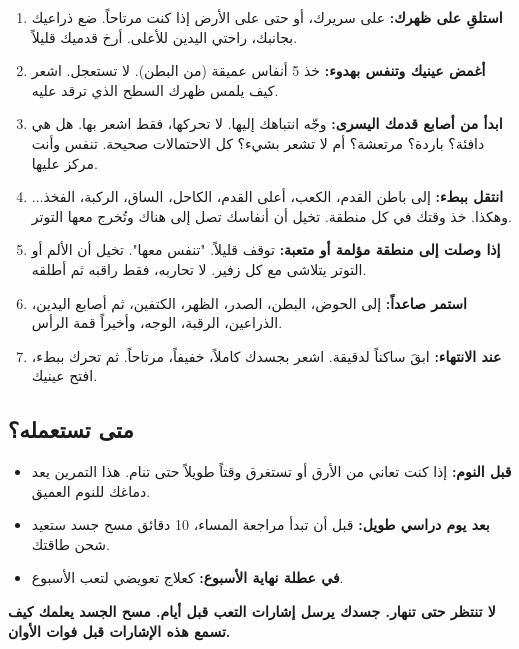 \documentclass[12pt,a4paper]{book}
\newcommand{\importantAr}[1]{%
	\begin{important}
		\bfseries #1
	\end{important}
}
\begin{document}
	\begin{enumerate}
		\item \textbf{استلقِ على ظهرك:} على سريرك، أو حتى على الأرض إذا كنت مرتاحاً. ضع ذراعيك بجانبك، راحتي اليدين للأعلى. أرخ قدميك قليلاً.
		
		\item \textbf{أغمض عينيك وتنفس بهدوء:} خذ 5 أنفاس عميقة (من البطن). لا تستعجل. اشعر كيف يلمس ظهرك السطح الذي ترقد عليه.
		
		\item \textbf{ابدأ من أصابع قدمك اليسرى:} وجّه انتباهك إليها. لا تحركها، فقط اشعر بها. هل هي دافئة؟ باردة؟ مرتعشة؟ أم لا تشعر بشيء؟ كل الاحتمالات صحيحة. تنفس وأنت مركز عليها.
		
		\item \textbf{انتقل ببطء:} إلى باطن القدم، الكعب، أعلى القدم، الكاحل، الساق، الركبة، الفخذ... وهكذا. خذ وقتك في كل منطقة. تخيل أن أنفاسك تصل إلى هناك وتُخرج معها التوتر.
		
		\item \textbf{إذا وصلت إلى منطقة مؤلمة أو متعبة:} توقف قليلاً. "تنفس معها". تخيل أن الألم أو التوتر يتلاشى مع كل زفير. لا تحاربه، فقط راقبه ثم أطلقه.
		
		\item \textbf{استمر صاعداً:} إلى الحوض، البطن، الصدر، الظهر، الكتفين، ثم أصابع اليدين، الذراعين، الرقبة، الوجه، وأخيراً قمة الرأس.
		
		\item \textbf{عند الانتهاء:} ابقَ ساكناً لدقيقة. اشعر بجسدك كاملاً، خفيفاً، مرتاحاً. ثم تحرك ببطء، افتح عينيك.
	\end{enumerate}
	
	\subsection{متى تستعمله؟}
	
	\begin{itemize}
		\item \textbf{قبل النوم:} إذا كنت تعاني من الأرق أو تستغرق وقتاً طويلاً حتى تنام. هذا التمرين يعد دماغك للنوم العميق.
		\item \textbf{بعد يوم دراسي طويل:} قبل أن تبدأ مراجعة المساء، 10 دقائق مسح جسد ستعيد شحن طاقتك.
		\item \textbf{في عطلة نهاية الأسبوع:} كعلاج تعويضي لتعب الأسبوع.
	\end{itemize}
	
	\importantAr{لا تنتظر حتى تنهار. جسدك يرسل إشارات التعب قبل أيام. مسح الجسد يعلمك كيف تسمع هذه الإشارات قبل فوات الأوان.}
	
\end{document}
